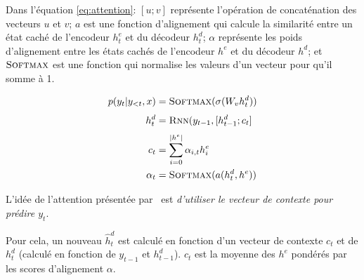 Dans l'équation \ref{eq:attention}: $[u;v]$ représente l'opération de concaténation des vecteurs $u$ et $v$; $a$ est une fonction d'alignement qui calcule la similarité entre un état caché de l'encodeur $h^e_t$ et du décodeur $h^d_t$; $\alpha$ représente les poids d'alignement entre les états cachés de l'encodeur $h^e$ et du décodeur $h^d$;  et $\textsc{Softmax}$ est une fonction qui normalise les valeurs d'un vecteur pour qu'il somme à 1.

\begin{equation}\label{eq:attention}
  \begin{split}
    p(y_t|y_{<t},x) & = \textsc{Softmax}(\sigma(W_v h^d_t)) \\[.3em]
    h^d_t & = \textsc{Rnn}(y_{t-1}, [h^d_{t-1};c_t]  \\[.3em]
    c_t & = \sum^{|h^e|}_{i=0} \alpha_{i,t} h^e_i \\
    \alpha_{t} & = \textsc{Softmax}(a(h^d_t, h^e)) \\
  \end{split}
\end{equation}

%
%

\iffalse
    L'idée de l'attention présentée par~\cite{luong_effective_2015} est \emph{d'utiliser le vecteur de contexte pour prédire $y_t$}.
    
    Pour cela, un nouveau $\hat{h}^d_t$ est calculé en fonction d'un vecteur de contexte $c_t$ et de $h^d_t$ (calculé en fonction de $y_{t-1}$ et $h^d_{t-1}$). $c_t$ est la moyenne des $h^e$ pondérés par les scores d'alignement $\alpha$.
    
